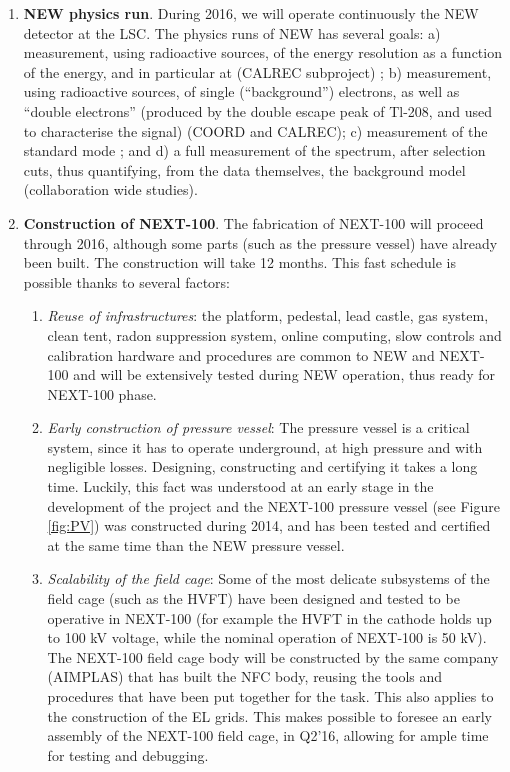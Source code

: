 \begin{enumerate}
\item {\bf NEW physics run}. During 2016, we will operate continuously the NEW detector at the LSC. The physics runs of NEW has several goals: a) measurement, using radioactive sources, of the energy resolution as a function of the energy, and in particular at \Qbb (CALREC subproject) ; b) measurement, using radioactive sources, of single (``background'') electrons, as well as ``double electrons'' (produced by the double escape peak of Tl-208, and used to characterise the signal) (COORD and CALREC); c) measurement of the standard mode \bbtnu; and d) a full measurement of the spectrum, after selection cuts, thus quantifying, from the data themselves, the background model (collaboration wide studies). 
%

\item {\bf Construction of NEXT-100}. The fabrication of NEXT-100 will proceed through 2016, although some parts (such as the pressure vessel) have already been built. 
The construction will take 12 months. This fast schedule is possible thanks to several factors:
\begin{enumerate}
\item {\em Reuse of infrastructures}: the platform, pedestal, lead castle, gas system, clean tent, radon suppression system, online computing, slow controls and calibration hardware and procedures are common to NEW and NEXT-100 and will be extensively tested during NEW operation, thus ready for NEXT-100 phase.
\item {\em Early construction of pressure vessel}: The pressure vessel is a critical system, since it has to operate underground, at high pressure and with negligible losses. Designing, constructing and certifying it takes a long time. Luckily, this fact was understood at an early stage in the development of the project and the NEXT-100 pressure vessel (see Figure \ref{fig:PV}) was constructed during 2014, and has been tested and certified at the same time than the NEW pressure vessel. 
\item {\em Scalability of the field cage}: Some of the most delicate subsystems of the field cage (such as the HVFT) have been designed and tested to be operative in NEXT-100 (for example the HVFT in the cathode holds up to 100 kV voltage, while the nominal operation of NEXT-100 is 50 kV). The NEXT-100 field cage body will be constructed by the same company (AIMPLAS) that has built the NFC body, reusing the tools and procedures that have been put together for the task. This also applies to the construction of the EL grids. 
This makes possible to foresee an early assembly of the NEXT-100 field cage, in Q2'16, allowing for ample time for testing and debugging.


\end{enumerate}
\end{enumerate}
